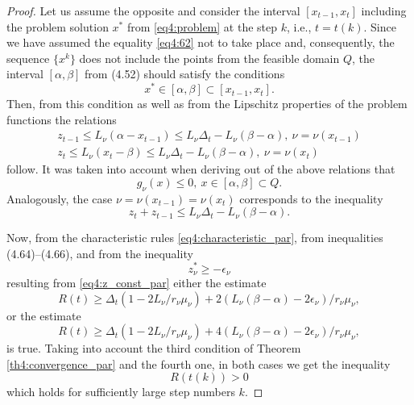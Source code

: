 \begin{proof}
  Let us assume the opposite and consider the interval $[x_{t-1},x_t]$ including the problem solution $x^*$ from \eqref{eq4:problem} at the step $k$, i.e., $t=t(k)$. Since we have assumed the equality \eqref{eq4:62} not to take place and, consequently, the sequence $\{x^k\}$ does not include the points from the feasible domain $Q$, the interval $[\alpha,\beta]$ from (4.52) should satisfy the conditions
  \begin{equation}
    \label{eq4:63}
    x^*\in [\alpha,\beta]\subset[x_{t-1}, x_t].
  \end{equation}
  Then, from this condition as well as from the Lipschitz properties of the problem functions the relations
  \begin{gather}
    z_{t-1}\le L_\nu(\alpha - x_{t-1})\le L_\nu\Delta_t-L_\nu(\beta-\alpha),\:\nu=\nu(x_{t-1}) \\
    z_t\le L_\nu(x_{t}-\beta)\le L_\nu\Delta_t-L_\nu(\beta-\alpha),\:\nu=\nu(x_{t})
  \end{gather}
  follow. It was taken into account when deriving out of the above relations that
  \begin{displaymath}
    g_\nu(x)\le 0,\: x\in[\alpha,\beta]\subset Q.
  \end{displaymath}
  Analogously, the case $\nu=\nu(x_{t-1})=\nu(x_t)$ corresponds to the inequality
  \begin{equation}
    z_t+z_{t-1}\le L_\nu \Delta_t - L_\nu(\beta-\alpha).
  \end{equation}

  Now, from the characteristic rules \eqref{eq4:characteristic_par}, from inequalities (4.64)–(4.66), and from the inequality
  \begin{displaymath}
    z^*_\nu\ge-\epsilon_\nu
  \end{displaymath}
  resulting from \eqref{eq4:z_const_par} either the estimate
  \begin{displaymath}
    R(t)\ge\Delta_t(1-2L_\nu/r_\nu\mu_\nu)+2(L_\nu(\beta-\alpha)-2\epsilon_\nu)/r_\nu\mu_\nu,
  \end{displaymath}
  or the estimate
  \begin{displaymath}
    R(t)\ge\Delta_t(1-2L_\nu/r_\nu\mu_\nu)+4(L_\nu(\beta-\alpha)-2\epsilon_\nu)/r_\nu\mu_\nu,
  \end{displaymath}
  is true. Taking into account the third condition of Theorem \ref{th4:convergence_par} and the fourth one, in both cases we get the inequality
  \begin{equation}
    \label{eq4:67}
    R(t(k))>0
  \end{equation}
  which holds for sufficiently large step numbers $k$.


\end{proof}
